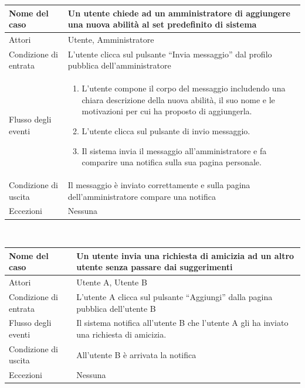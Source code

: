\documentclass[a4paper,12pt]{article}
\begin{document}
\begin{tabularx}{\textwidth}{|l|X|}
\hline Nome del caso & Un utente chiede ad un amministratore di aggiungere una nuova abilità al set predefinito di sistema \\
\hline Attori & Utente, Amministratore \\ 
\hline Condizione di entrata & L'utente clicca sul pulsante “Invia messaggio” dal profilo pubblica dell'amministratore \\
\hline Flusso degli eventi & 
\begin{enumerate}
\itemsep0em
\item L'utente compone il corpo del messaggio includendo una chiara descrizione della nuova abilità, il suo nome e le motivazioni per cui ha proposto di aggiungerla.
\item L'utente clicca sul pulsante di invio messaggio.
\item Il sistema invia il messaggio all'amministratore e fa comparire una notifica sulla sua pagina personale.
\end{enumerate}
 \\ 
\hline Condizione di uscita & Il messaggio è inviato correttamente e sulla pagina dell'amministratore compare una notifica \\
\hline Eccezioni & Nessuna
\\
\hline 
\end{tabularx} \\[1\baselineskip]
\begin{tabularx}{\textwidth}{|l|X|}
\hline Nome del caso & Un utente invia una richiesta di amicizia ad un altro utente senza passare dai suggerimenti \\
\hline Attori & Utente A, Utente B \\ 
\hline Condizione di entrata & L'utente A clicca sul pulsante “Aggiungi” dalla pagina pubblica dell'utente B \\
\hline Flusso degli eventi & Il sistema notifica all'utente B che l'utente A gli ha inviato una richiesta di amicizia.
 \\ 
\hline Condizione di uscita & All'utente B è arrivata la notifica \\
\hline Eccezioni & Nessuna
\\
\hline 
\end{tabularx} \\[1\baselineskip]
\end{document}
